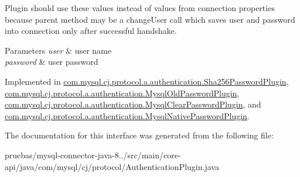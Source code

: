 Plugin should use these values instead of values from connection properties because parent method may be a change\+User call which saves user and password into connection only after successful handshake.


\begin{DoxyParams}{Parameters}
{\em user} & user name \\
\hline
{\em password} & user password \\
\hline
\end{DoxyParams}


Implemented in \mbox{\hyperlink{classcom_1_1mysql_1_1cj_1_1protocol_1_1a_1_1authentication_1_1_sha256_password_plugin_a3094a9ba3e8a9543ec5e4d89bbb23d47}{com.\+mysql.\+cj.\+protocol.\+a.\+authentication.\+Sha256\+Password\+Plugin}}, \mbox{\hyperlink{classcom_1_1mysql_1_1cj_1_1protocol_1_1a_1_1authentication_1_1_mysql_old_password_plugin_a0d3234b9087f06e3d10a3fe13566c6a8}{com.\+mysql.\+cj.\+protocol.\+a.\+authentication.\+Mysql\+Old\+Password\+Plugin}}, \mbox{\hyperlink{classcom_1_1mysql_1_1cj_1_1protocol_1_1a_1_1authentication_1_1_mysql_clear_password_plugin_aac79ca0c6d0e4fd7207f2de8e6f1e6a8}{com.\+mysql.\+cj.\+protocol.\+a.\+authentication.\+Mysql\+Clear\+Password\+Plugin}}, and \mbox{\hyperlink{classcom_1_1mysql_1_1cj_1_1protocol_1_1a_1_1authentication_1_1_mysql_native_password_plugin_a24947d4cf7090930c52d6451e87c027f}{com.\+mysql.\+cj.\+protocol.\+a.\+authentication.\+Mysql\+Native\+Password\+Plugin}}.



The documentation for this interface was generated from the following file\+:\begin{DoxyCompactItemize}
\item 
pruebas/mysql-\/connector-\/java-\/8../src/main/core-\/api/java/com/mysql/cj/protocol/Authentication\+Plugin.\+java\end{DoxyCompactItemize}
